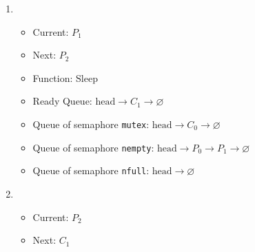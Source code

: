 \documentclass[11pt]{article}
\begin{document}
\begin{question}
\begin{enumerate}
{
                }
                \item {
                    \begin{itemize}
                        \item{Current: $P_{1}$}
                        \item{Next: $P_{2}$}
                        \item{Function: Sleep}
                        \item{
                            Ready Queue: $\text{head}\longrightarrow
                            C_{1}\longrightarrow
                            \varnothing$
                        } \item{
                            Queue of semaphore {\tt mutex}: $\text{head}\longrightarrow
                            C_{0}\longrightarrow
                            \varnothing$
                        }
                        \item{
                            Queue of semaphore {\tt nempty}: $\text{head}\longrightarrow
                            P_{0}\longrightarrow
                            P_{1}\longrightarrow
                            \varnothing$
                        }
                        \item{
                            Queue of semaphore {\tt nfull}: $\text{head}\longrightarrow
                            \varnothing$
                        }
                \end{itemize}
                }
                \item {
                    \begin{itemize}
                        \item{Current: $P_{2}$}
                        \item{Next: $C_{1}$}

\end{itemize}}
\end{enumerate}
\end{question}
\end{document}
